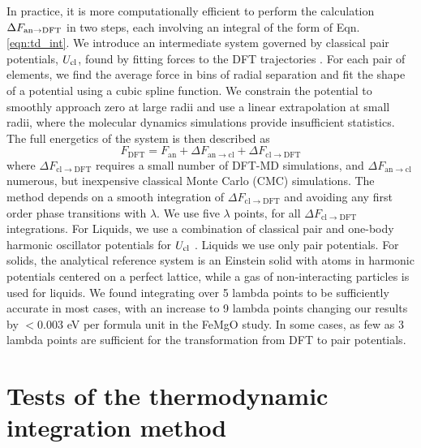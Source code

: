 In practice, it is more computationally efficient to perform the calculation $\Delta
F_{\rm an\to DFT}$ in two steps, each involving an integral of the form of Eqn.
\ref{eqn:td_int}. We introduce an intermediate system governed by classical pair
potentials, $U_{\rm cl}$, found by fitting forces to the DFT trajectories
\citep{Wilson2010,Izvekov2004}. For each pair of elements, we find the average force in bins
of radial separation and fit the shape of a potential using a cubic spline function. We
constrain the potential to smoothly approach zero at large radii and use a linear
extrapolation at small radii, where the molecular dynamics simulations provide
insufficient statistics. The full energetics of the system is then described as
\begin{equation} \label{eqn:two_step}
F_{\mathrm{DFT}}=F_{\mathrm{\mathrm{an}}}+\Delta
F_{\mathrm{an} \to \mathrm{cl}}+\Delta F_{\mathrm{cl}\to \mathrm{DFT}}
\end{equation}
where $\Delta F_{\mathrm{cl}\to \mathrm{DFT}}$ requires a small number of DFT-MD
simulations, and $\Delta F_{\mathrm{an} \to \mathrm{cl}}$ numerous, but inexpensive
classical Monte Carlo (CMC) simulations. The method depends on a smooth integration
of $\Delta F_{\mathrm{cl}\to \mathrm{DFT}}$ and avoiding any first order phase
transitions with $\lambda$.  We use five $\lambda$ points, for all $\Delta
F_{\mathrm{cl}\to \mathrm{DFT}}$ integrations. For Liquids, we use a combination of
classical pair and one-body harmonic oscillator potentials for $U_{\rm cl}$
\citep{Wilson2012a,Wahl2013}.  Liquids we use only pair potentials. For solids, the
analytical reference system is an Einstein solid with atoms in harmonic potentials
centered on a perfect lattice, while a gas of non-interacting particles is used for
liquids. We found integrating over 5 lambda points to be sufficiently accurate in
most cases, with an increase to 9 lambda points changing our results by $<0.003$ eV
per formula unit in the FeMgO study. In some cases, as few as 3 lambda points are
sufficient for the transformation from DFT to pair potentials. 


\section{Tests of the thermodynamic integration method}

